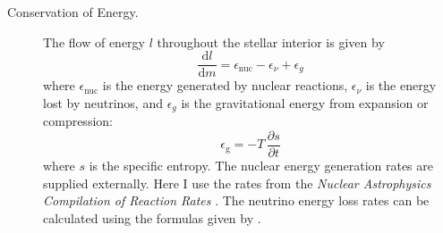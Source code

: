 \begin{description}
    \item[Conservation of Energy.]
    The flow of energy $l$ throughout the stellar interior is given by 
    \begin{equation} \label{eq:energy} \boxed{
        \frac{\text{d}l}{\text{d}m}
        =
        \epsilon_{\text{nuc}} - \epsilon_\nu + \epsilon_g %
    }\end{equation}
    where $\epsilon_{\text{nuc}}$ is the energy generated by nuclear reactions, $\epsilon_\nu$ is the energy lost by neutrinos, and $\epsilon_g$ is the gravitational energy from expansion or compression: %
    \begin{equation} \label{eq:eps-g}
        \epsilon_{\text{g}} = -T\, \frac{\partial s}{\partial t}
    \end{equation}
    where $s$ is the specific entropy. 
    The nuclear energy generation rates are supplied externally. 
    Here I use the rates from the \emph{Nuclear Astrophysics Compilation of Reaction Rates} \citep[\textsc{NACRE},][]{1999NuPhA.656....3A}. 
    The neutrino energy loss rates can be calculated using the formulas given by \citet{1996ApJS..102..411I}. 
    

\end{description}

